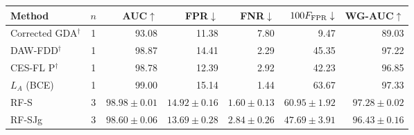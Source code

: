 \begin{tabular}{lcrrrrr}
\toprule
Method & $n$ & AUC$\uparrow$ & FPR$\downarrow$ & FNR$\downarrow$ & $100F_{\rm FPR}\downarrow$ & WG-AUC$\uparrow$ \\
\midrule
Corrected GDA$^\dagger$ & 1 & 93.08 & 11.38 & 7.80 & 9.47 & 89.03 \\
DAW-FDD$^\dagger$ & 1 & 98.87 & 14.41 & 2.29 & 45.35 & 97.22 \\
CES-FL P$^\dagger$ & 1 & 98.78 & 12.39 & 2.92 & 42.23 & 96.85 \\
$L_A$ (BCE) & 1 & 99.00 & 15.14 & 1.44 & 63.67 & 97.33 \\
RF-S & 3 & $98.98 \pm 0.01$ & $14.92 \pm 0.16$ & $1.60 \pm 0.13$ & $60.95 \pm 1.92$ & $97.28 \pm 0.02$ \\
RF-SJg & 3 & $98.60 \pm 0.06$ & $13.69 \pm 0.28$ & $2.84 \pm 0.26$ & $47.69 \pm 3.91$ & $96.43 \pm 0.16$ \\
\bottomrule
\end{tabular}
